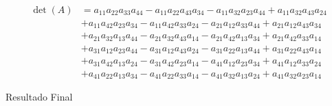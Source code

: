 \documentclass[12pt]{article}
\begin{document}
\paragraph{}
\[
\begin{aligned}
    \operatorname{det}(A) & =
    a_{11} a_{22} a_{33} a_{44} -a_{11} a_{22} a_{43} a_{34} -a_{11} a_{32} a_{23} 
    a_{44} +a_{11} a_{32} a_{43} a_{24} \\
    & +a_{11} a_{42} a_{23} a_{34} -a_{11} a_{42} a_{33} a_{24} -a_{21} a_{12} a_{33} a_{44} 
    +a_{21} a_{12} a_{43} a_{34} \\
    & +a_{21} a_{32} a_{13} a_{44} -a_{21} a_{32} a_{43} a_{14} -a_{21} a_{42} a_{13} a_{34} 
    +a_{21} a_{42} a_{33} a_{14} \\
    & +a_{31} a_{12} a_{23} a_{44} -a_{31} a_{12} a_{43} a_{24} -a_{31} a_{22} a_{13} a_{44} 
    +a_{31} a_{22} a_{43} a_{14} \\
    & +a_{31} a_{42} a_{13} a_{24} -a_{31} a_{42} a_{23} a_{14} -a_{41} a_{12} a_{23} a_{34} 
    +a_{41} a_{12} a_{33} a_{24} \\
    &  +a_{41} a_{22} a_{13} a_{34} -a_{41} a_{22} a_{33} a_{14} -a_{41} a_{32} a_{13} a_{24} 
    +a_{41} a_{32} a_{23} a_{14} 
\end{aligned}
\]
\begin{center}
    $$$$
    Resultado Final \\
\end{center}

\begin{center}
\end{center}
\newpage
\end{document}
